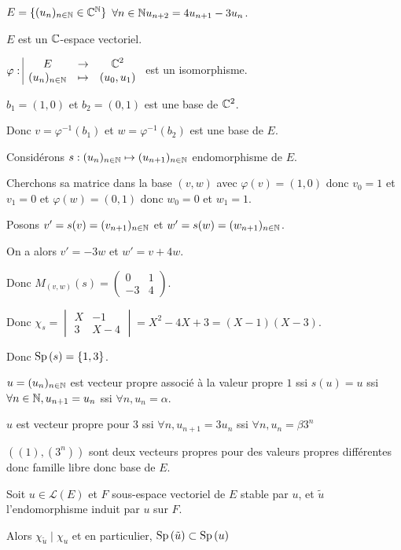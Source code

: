 \begin{exemple}
    $E = \{(u_n)_{n \in \mathbb{N}} \in \mathbb{C}^{\mathbb{N}}\}$ $\forall n \in \mathbb{N} u_{n + 2} = 4 u_{n + 1} - 3 u_n$.

    $E$ est un $\mathbb{C}$-espace vectoriel. 

    $\varphi: \space \begin{array}{|ccc} \displaystyle E & \to & \displaystyle \mathbb{C}^2 \\ \displaystyle (u_n)_{n \in \mathbb{N}} & \mapsto & \displaystyle (u_0, u_1) \end{array}$ est un isomorphisme.

    $b_1 = (1, 0)$ et $b_2 = (0, 1)$ est une base de $\mathbb{C}^2$.

    Donc $v = \varphi^{-1} (b_1) $ et $w = \varphi^{-1} (b_2)$ est une base de $E$.

    Considérons $s : (u_n)_{n \in \mathbb{N}} \mapsto (u_{n + 1})_{n \in \mathbb{N}}$ endomorphisme de $E$.

    Cherchons sa matrice dans la base $(v, w)$ avec $\varphi(v) = (1, 0)$ donc 
    $v_0 = 1$ et $v_1 = 0$    
    et $\varphi(w) = (0, 1)$ donc $w_0 = 0$ et $w_1 = 1$.

    Posons $v' = s(v) = (v_{n + 1})_{n \in \mathbb{N}}$ et $w' = s(w) = (w_{n + 1})_{n \in \mathbb{N}}$.

    On a alors $v' = -3w$ et $w' = v + 4w$.

    Donc $M_{(v, w)}(s) = \begin{pmatrix}
        0 & 1 \\
        -3 & 4
    \end{pmatrix}$.

    Donc $\chi_s = \begin{vmatrix}
        X & -1 \\
        3 & X - 4
    \end{vmatrix} = X^2 - 4X + 3 = (X - 1)(X - 3)$.

    Donc $\operatorname{Sp} \,(s) = \{1, 3\}$.


    $u = (u_n)_{n \in \mathbb{N}}$ est vecteur propre associé à la valeur propre $1$ ssi 
    $s(u) = u$ ssi $\forall n \in \mathbb{N}, u_{n + 1} = u_n$ ssi $\forall n, u_n = \alpha$. 

    $u$ est vecteur propre pour $3$ ssi $\forall n, u_{n + 1} = 3 u_n$ ssi $\forall n, u_n = \beta 3^n$

    $((1), (3^n))$ sont deux vecteurs propres pour des valeurs propres différentes donc famille libre donc base de 
    $E$. 
\end{exemple}


\begin{proposition}{}{}
    Soit $u \in \mathscr L(E)$ et $F$ sous-espace vectoriel de $E$ stable par $u$, et $\tilde u$
    l'endomorphisme induit par $u$ sur $F$. 

    Alors 
    $\chi_{\tilde u} \mid \chi_u$ et en particulier, $\operatorname{Sp} \,(\tilde u) \subset \operatorname{Sp} \, (u)$
\end{proposition}

